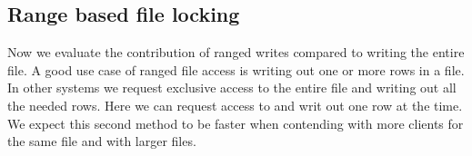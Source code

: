 
\subsection{Range based file locking} \label{sec:res_range}
Now we evaluate the contribution of ranged writes compared to writing the entire file. A good use case of ranged file access is writing out one or more rows in a file. In other systems we request exclusive access to the entire file and writing out all the needed rows. Here we can request access to and writ out one row at the time. We expect this second method to be faster when contending with more clients for the same file and with larger files.

